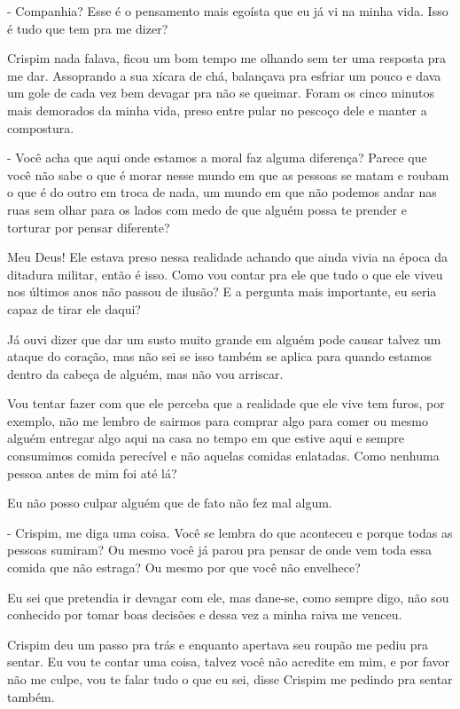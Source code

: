 - Companhia? Esse é o pensamento mais egoísta que eu já vi na minha vida. Isso é tudo que tem pra me dizer?

Crispim nada falava, ficou um bom tempo me olhando sem ter uma resposta pra me dar. Assoprando a sua xícara de chá, balançava pra esfriar um pouco e dava um gole de cada vez bem devagar pra não se queimar. Foram os cinco minutos mais demorados da minha vida, preso entre pular no pescoço dele e manter a compostura.

- Você acha que aqui onde estamos a moral faz alguma diferença? Parece que você não sabe o que é morar nesse mundo em que as pessoas se matam e roubam o que é do outro em troca de nada, um mundo em que não podemos andar nas ruas sem olhar para os lados com medo de que alguém possa te prender e torturar por pensar diferente?

Meu Deus! Ele estava preso nessa realidade achando que ainda vivia na época da ditadura militar, então é isso. Como vou contar pra ele que tudo o que ele viveu nos últimos anos não passou de ilusão? E a pergunta mais importante, eu seria capaz de tirar ele daqui?

Já ouvi dizer que dar um susto muito grande em alguém pode causar talvez um ataque do coração, mas não sei se isso também se aplica para quando estamos dentro da cabeça de alguém, mas não vou arriscar.

Vou tentar fazer com que ele perceba que a realidade que ele vive tem furos, por exemplo, não me lembro de sairmos para comprar algo para comer ou mesmo alguém entregar algo aqui na casa no tempo em que estive aqui e sempre consumimos comida perecível e não aquelas comidas enlatadas. Como nenhuma pessoa antes de mim foi até lá?

Eu não posso culpar alguém que de fato não fez mal algum.

- Crispim, me diga uma coisa. Você se lembra do que aconteceu e porque todas as pessoas sumiram? Ou mesmo você já parou pra pensar de onde vem toda essa comida que não estraga? Ou mesmo por que você não envelhece?

Eu sei que pretendia ir devagar com ele, mas dane-se, como sempre digo, não sou conhecido por tomar boas decisões e dessa vez a minha raiva me venceu.

Crispim deu um passo pra trás e enquanto apertava seu roupão me pediu pra sentar. Eu vou te contar uma coisa, talvez você não acredite em mim, e por favor não me culpe, vou te falar tudo o que eu sei, disse Crispim me pedindo pra sentar também.

